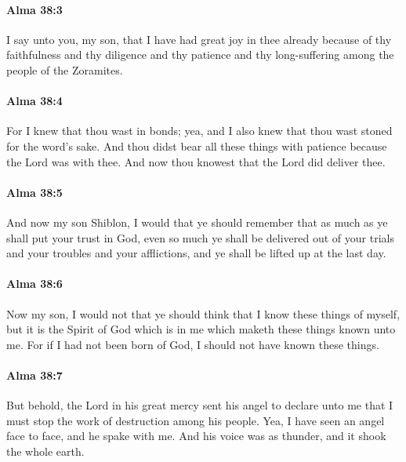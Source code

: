 		\paragraph{Alma 38:3} %
			\label{ALMA-38-3}

			I say unto you, my son, that I have had great joy in thee already
			because of thy faithfulness and thy diligence and thy patience
			and thy long-suffering among the people of the Zoramites.

		\paragraph{Alma 38:4} %
			\label{ALMA-38-4}

			For I knew that thou wast in bonds;
			yea, and I also knew that thou wast stoned for the word's sake.
			And thou didst bear all these things with patience
			because the Lord was with thee.
			And now thou knowest that the Lord did deliver thee.

		\paragraph{Alma 38:5} %
			\label{ALMA-38-5}

			And now my son Shiblon, I would that ye should remember
			that as much as ye shall put your trust in God,
			even so much ye shall be delivered out of your trials
			and your troubles and your afflictions,
			and ye shall be lifted up at the last day.

		\paragraph{Alma 38:6} %
			\label{ALMA-38-6}

			Now my son, I would not that ye should think
			that I know these things of myself,
			but it is the Spirit of God which is in me
			which maketh these things known unto me.
			For if I had not been born of God,
			I should not have known these things.

		\paragraph{Alma 38:7} %
			\label{ALMA-38-7}

			But behold, the Lord in his great mercy sent his angel to declare unto me
			that I must stop the work of destruction among his people.
			Yea, I have seen an angel face to face,
			and he spake with me.
			And his voice was as thunder,
			and it shook the whole earth.

